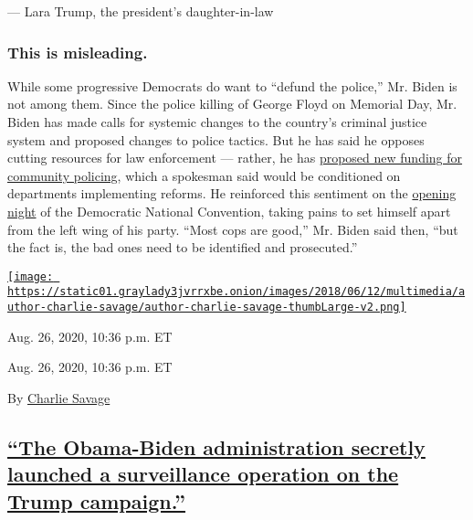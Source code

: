 --- Lara Trump, the president's daughter-in-law

\hypertarget{this-is-misleading-6}{%
\subsubsection{\texorpdfstring{\textbf{This is
misleading}.}{This is misleading.}}\label{this-is-misleading-6}}

While some progressive Democrats do want to ``defund the police,'' Mr.
Biden is not among them. Since the police killing of George Floyd on
Memorial Day, Mr. Biden has made calls for systemic changes to the
country's criminal justice system and proposed changes to police
tactics. But he has said he opposes cutting resources for law
enforcement --- rather, he has
\href{https://slack-redir.net/link?url=https\%3A\%2F\%2Fwww.nytimes3xbfgragh.onion\%2F2020\%2F06\%2F26\%2Fus\%2Fpolitics\%2Fdefund-police-protests-democrats.html}{proposed
new funding for community policing}, which a spokesman said would be
conditioned on departments implementing reforms. He reinforced this
sentiment on the
\href{https://slack-redir.net/link?url=https\%3A\%2F\%2Fwww.nytimes3xbfgragh.onion\%2F2020\%2F08\%2F19\%2Fus\%2Fpolitics\%2Fdemocrats-biden-defund-police.html}{opening
night} of the Democratic National Convention, taking pains to set
himself apart from the left wing of his party. ``Most cops are good,''
Mr. Biden said then, ``but the fact is, the bad ones need to be
identified and prosecuted.''

\href{https://www.nytimes3xbfgragh.onion/by/charlie-savage}{\texttt{[image: https://static01.graylady3jvrrxbe.onion/images/2018/06/12/multimedia/author-charlie-savage/author-charlie-savage-thumbLarge-v2.png]}}

Aug. 26, 2020, 10:36 p.m. ET

Aug. 26, 2020, 10:36 p.m. ET

By \href{https://www.nytimes3xbfgragh.onion/by/charlie-savage}{Charlie
Savage}

\hypertarget{the-obama-biden-administration-secretly-launched-a-surveillance-operation-on-the-trump-campaign}{%
\subsection{\texorpdfstring{\protect\hyperlink{the-obama-biden-administration-secretly-launched-a-surveillance-operation-on-the-trump-campaign}{``The
Obama-Biden administration secretly launched a surveillance operation on
the Trump
campaign.''}}{``The Obama-Biden administration secretly launched a surveillance operation on the Trump campaign.''}}\label{the-obama-biden-administration-secretly-launched-a-surveillance-operation-on-the-trump-campaign}}

